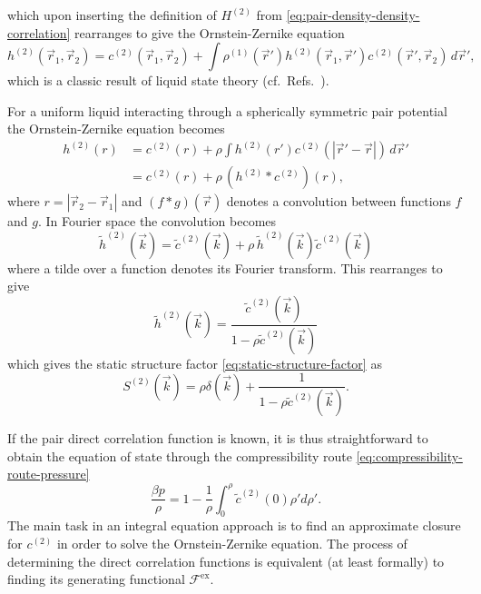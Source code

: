 which upon inserting the definition of $H^{(2)}$ from \eqref{eq:pair-density-density-correlation} rearranges to give the Ornstein-Zernike equation
\begin{equation}\label{eq:ornstein-zernike-generic}
  h^{(2)}(\vec{r}_1, \vec{r}_2) =
  c^{(2)}(\vec{r}_1, \vec{r}_2) +
  \int
  \rho^{(1)}(\vec{r}')
  h^{(2)}(\vec{r}_1, \vec{r}')
  c^{(2)}(\vec{r}', \vec{r}_2)
  \, d\vec{r}',
\end{equation}
which is a classic result of liquid state theory (cf.\ Refs.\ \cite{OrnsteinPASA1914,Hansen2013,EvansAP1979}).

\vspace{0.5em}

\begin{tcolorbox}[title=Ornstein-Zernike equation for a uniform simple liquid]
For a uniform liquid interacting through a spherically symmetric pair potential the Ornstein-Zernike equation becomes
\begin{equation}\label{eq:ornstein-zernike-spherical}
  \begin{split}
    h^{(2)}(r)
    &=
    c^{(2)}(r) +
    \rho
    \int
    h^{(2)}(r')
    c^{(2)}(|\vec{r}' - \vec{r}|)
    \, d\vec{r}'
    \\ &=
    c^{(2)}(r) + \rho \, (h^{(2)} * c^{(2)})(r),
  \end{split}
\end{equation}
where $r = |\vec{r}_2 - \vec{r}_1|$ and $(f*g)(\vec{r})$ denotes a convolution between functions $f$ and $g$.
In Fourier space the convolution becomes%
\begin{equation*}
  \widetilde{h}^{(2)}(\vec{k})
  =
  \widetilde{c}^{(2)}(\vec{k}) +
  \rho \, \widetilde{h}^{(2)}(\vec{k}) \widetilde{c}^{(2)}(\vec{k})
\end{equation*}
where a tilde over a function denotes its Fourier transform.
This rearranges to give
\begin{equation*}
  \widetilde{h}^{(2)}(\vec{k})
  =
  \frac{\widetilde{c}^{(2)}(\vec{k})}{1 - \rho \widetilde{c}^{(2)}(\vec{k})}
\end{equation*}
which gives the static structure factor \eqref{eq:static-structure-factor} as
\begin{equation*}
  S^{(2)}(\vec{k})
  =
  \rho \delta(\vec{k}) +
  \frac{1}{1 - \rho \widetilde{c}^{(2)}(\vec{k})}.
\end{equation*}
\end{tcolorbox}

If the pair direct correlation function is known, it is thus straightforward to obtain the equation of state through the compressibility route \eqref{eq:compressibility-route-pressure}
\begin{equation*}
  \frac{\beta p}{\rho}
  =
  1 - \frac{1}{\rho} \int_0^\rho \widetilde{c}^{(2)}(0) \rho' d\rho'.
\end{equation*}
The main task in an integral equation approach is to find an approximate closure for $c^{(2)}$ in order to solve the Ornstein-Zernike equation.
The process of determining the direct correlation functions is equivalent (at least formally) to finding its generating functional $\mathcal{F}^\mathrm{ex}$.

